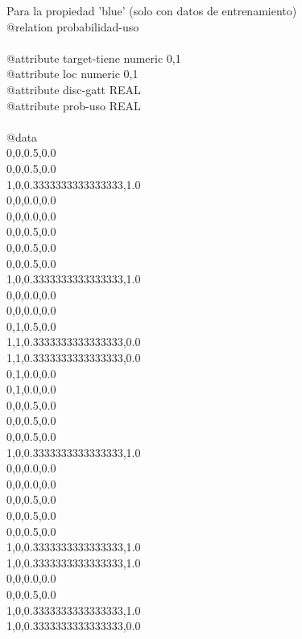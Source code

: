 Para la propiedad 'blue' (solo con datos de entrenamiento)\\

@relation probabilidad-uso\\

\\

@attribute target-tiene numeric {0,1}\\
@attribute loc numeric {0,1}\\
@attribute disc-gatt REAL\\
@attribute prob-uso REAL\\

\\

@data\\
0,0,0.5,0.0\\
0,0,0.5,0.0\\
1,0,0.3333333333333333,1.0\\
0,0,0.0,0.0\\
0,0,0.0,0.0\\
0,0,0.5,0.0\\
0,0,0.5,0.0\\
0,0,0.5,0.0\\
1,0,0.3333333333333333,1.0\\
0,0,0.0,0.0\\
0,0,0.0,0.0\\
0,1,0.5,0.0\\
1,1,0.3333333333333333,0.0\\
1,1,0.3333333333333333,0.0\\
0,1,0.0,0.0\\
0,1,0.0,0.0\\
0,0,0.5,0.0\\
0,0,0.5,0.0\\
0,0,0.5,0.0\\
1,0,0.3333333333333333,1.0\\
0,0,0.0,0.0\\
0,0,0.0,0.0\\
0,0,0.5,0.0\\
0,0,0.5,0.0\\
0,0,0.5,0.0\\
1,0,0.3333333333333333,1.0\\
1,0,0.3333333333333333,1.0\\
0,0,0.0,0.0\\
0,0,0.5,0.0\\
1,0,0.3333333333333333,1.0\\
1,0,0.3333333333333333,0.0\\
